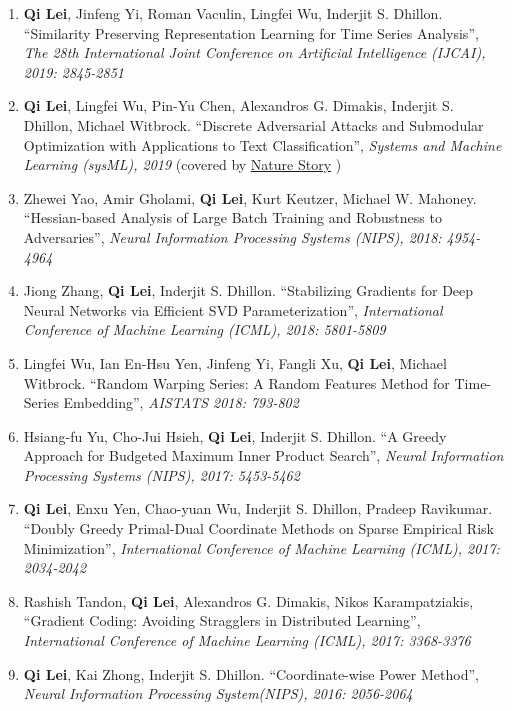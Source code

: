 \documentclass[margin, 10pt]{res} %
\begin{document}
\begin{resume}
\begin{enumerate}
  \item{ \textbf{Qi Lei}, Jinfeng Yi, Roman Vaculin, Lingfei Wu, Inderjit S. 
      Dhillon. ``Similarity Preserving Representation Learning for Time Series 
      Analysis'', \textit{The 28th International Joint Conference on Artificial 
    Intelligence (IJCAI), 2019: 2845-2851}}
  \item{\textbf{Qi Lei}, Lingfei Wu, Pin-Yu Chen, Alexandros G. Dimakis, Inderjit S. 
    Dhillon, Michael Witbrock. ``Discrete Adversarial Attacks and Submodular 
    Optimization with Applications to Text Classification'', \textit{Systems and Machine 
  Learning (sysML), 2019} (covered by \href{https://www.nature.com/articles/d41586-019-01510-1}{Nature Story} )   }
\item{Zhewei Yao, Amir Gholami, \textbf{Qi Lei}, Kurt Keutzer, Michael W. 
  Mahoney. ``Hessian-based Analysis of Large Batch Training and Robustness to 
Adversaries'', \textit{Neural Information Processing Systems (NIPS), 2018: 4954-4964}}
  \item{Jiong Zhang, \textbf{Qi Lei}, Inderjit S. Dhillon. 
        ``Stabilizing Gradients for Deep 
       Neural Networks via Efficient SVD Parameterization'', \textit{
    International Conference of Machine Learning (ICML), 2018: 5801-5809}}
  \item{Lingfei Wu, Ian En-Hsu Yen, Jinfeng Yi, Fangli Xu, \textbf{Qi Lei}, Michael Witbrock.
    ``Random Warping Series: A Random Features Method for Time-Series Embedding'', \textit{AISTATS 2018: 793-802}}
\item{Hsiang-fu Yu, Cho-Jui Hsieh, \textbf{Qi Lei}, Inderjit S. Dhillon. 
      ``A Greedy Approach for Budgeted Maximum 
      Inner Product Search'', \textit{Neural Information Processing Systems 
      (NIPS), 2017: 5453-5462}}
    \item{\textbf{Qi Lei}, Enxu Yen, Chao-yuan Wu, Inderjit S. Dhillon, Pradeep 
        Ravikumar. ``Doubly Greedy Primal-Dual Coordinate Methods on Sparse Empirical 
  Risk Minimization'', \textit{International Conference of Machine 
    Learning (ICML), 2017: 2034-2042}}
\item{Rashish Tandon, \textbf{Qi Lei}, 
    Alexandros G. Dimakis, Nikos Karampatziakis, ``Gradient Coding: Avoiding 
    Stragglers in Distributed Learning'', \textit{International Conference of 
  Machine Learning (ICML), 2017: 3368-3376}}
  \item {\textbf{Qi Lei},
      Kai Zhong, Inderjit S. Dhillon. ``Coordinate-wise Power Method'', 
  \textit{Neural Information Processing System(NIPS), 2016: 2056-2064}}		


\end{enumerate}
\end{resume}
\end{document}
